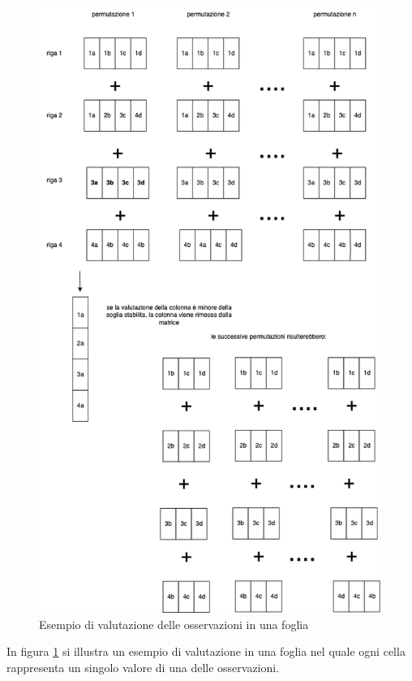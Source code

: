 \documentclass[a4paper,12pt]{report}
\begin{document}
\begin{figure}[H]
  \centering
  \includegraphics[scale=0.57]{img/utility/esempioFoglia.png}
  \caption{Esempio di valutazione delle osservazioni in una foglia}
  \label{fig:esempioFoglia}
\end{figure}

In figura \ref{fig:esempioFoglia} si illustra un esempio di valutazione in una foglia nel quale ogni cella rappresenta un singolo valore di una delle osservazioni.
\end{document}
